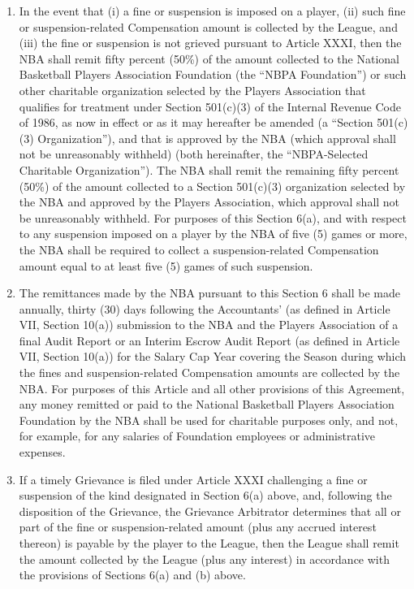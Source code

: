 \documentclass[
]{book}
\providecommand{\tightlist}{%
  \setlength{\itemsep}{0pt}\setlength{\parskip}{0pt}}
\begin{document}
\begin{enumerate}
\def\labelenumi{(\alph{enumi})}
\tightlist
\item
  In the event that (i) a fine or suspension is imposed on a player, (ii) such fine or suspension-related Compensation amount is collected by the League, and (iii) the fine or suspension is not grieved pursuant to Article XXXI, then the NBA shall remit fifty percent (50\%) of the amount collected to the National Basketball Players Association Foundation (the ``NBPA Foundation'') or such other charitable organization selected by the Players Association that qualifies for treatment under Section 501(c)(3) of the Internal Revenue Code of 1986, as now in effect or as it may hereafter be amended (a ``Section 501(c)(3) Organization''), and that is approved by the NBA (which approval shall not be unreasonably withheld) (both hereinafter, the ``NBPA-Selected Charitable Organization''). The NBA shall remit the remaining fifty percent (50\%) of the amount collected to a Section 501(c)(3) organization selected by the NBA and approved by the Players Association, which approval shall not be unreasonably withheld. For purposes of this Section 6(a), and with respect to any suspension imposed on a player by the NBA of five (5) games or more, the NBA shall be required to collect a suspension-related Compensation amount equal to at least five (5) games of such suspension.
\item
  The remittances made by the NBA pursuant to this Section 6 shall be made annually, thirty (30) days following the Accountants' (as defined in Article VII, Section 10(a)) submission to the NBA and the Players Association of a final Audit Report or an Interim Escrow Audit Report (as defined in Article VII, Section 10(a)) for the Salary Cap Year covering the Season during which the fines and suspension-related Compensation amounts are collected by the NBA. For purposes of this Article and all other provisions of this Agreement, any money remitted or paid to the National Basketball Players Association Foundation by the NBA shall be used for charitable purposes only, and not, for example, for any salaries of Foundation employees or administrative expenses.
\item
  If a timely Grievance is filed under Article XXXI challenging a fine or suspension of the kind designated in Section 6(a) above, and, following the disposition of the Grievance, the Grievance Arbitrator determines that all or part of the fine or suspension-related amount (plus any accrued interest thereon) is payable by the player to the League, then the League shall remit the amount collected by the League (plus any interest) in accordance with the provisions of Sections 6(a) and (b) above.
\end{enumerate}
\end{document}
